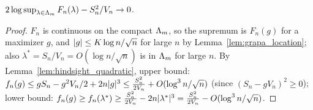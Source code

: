 \begin{lemma}
  \label{lem:hindsight_value}
  \leanok
  $2 \log \sup_{\lambda \in \Lambda_m} F_n(\lambda) - S_n^2/V_n \to 0$.
\end{lemma}

\begin{proof}
  \leanok
  $F_n$ is continuous on the compact $\Lambda_m$, so the supremum is $F_n(g)$ for a maximizer $g$, and
  $\lvert g \rvert \le K \log n / \sqrt n$ for large $n$ by Lemma~\ref{lem:grapa_location}; also
  $\lambda^* = S_n/V_n = O(\log n/\sqrt n)$ is in $\Lambda_m$ for large $n$. By
  Lemma~\ref{lem:hindsight_quadratic}, upper bound:
  $f_n(g) \le g S_n - g^2 V_n/2 + 2n\lvert g \rvert^3 \le \frac{S_n^2}{2V_n} + O(\log^3 n / \sqrt n)$
  (since $(S_n - g V_n)^2 \ge 0$); lower bound: $f_n(g) \ge f_n(\lambda^*) \ge \frac{S_n^2}{2V_n}
  - 2n\lvert \lambda^* \rvert^3 = \frac{S_n^2}{2V_n} - O(\log^3 n / \sqrt n)$.
\end{proof}
